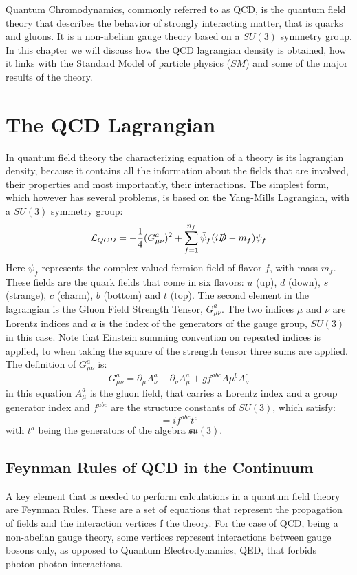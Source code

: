 Quantum Chromodynamics, commonly referred to as QCD, is the quantum field theory that describes the behavior of strongly interacting matter, that is quarks and gluons. It is a non-abelian gauge theory based on a $SU(3)$ symmetry group. In this chapter we will discuss how the QCD lagrangian density is obtained, how it links with the Standard Model of particle physics ($SM$) and some of the major results of the theory. \cite{peskin}

\section{The QCD Lagrangian}
In quantum field theory the characterizing equation of a theory is its lagrangian density, because it contains all the information about the fields that are involved, their properties and most importantly, their interactions. The simplest form, which however has several problems, is based on the Yang-Mills Lagrangian, with a $SU(3)$ symmetry group:  
\begin{equation}
  \mathcal{L}_{QCD} = -\frac{1}{4}(G_{\mu\nu}^a)^2 + \sum_{f=1}^{n_f}\bar{\psi}_f(i\slashed{D} - m_f)\psi_f
\end{equation}
Here $\psi_f$ represents the complex-valued fermion field of flavor $f$, with mass $m_f$. These fields are the quark fields that come in six flavors: $u$ (up), $d$ (down), $s$ (strange), $c$ (charm), $b$ (bottom) and $t$ (top).  The second element in the lagrangian is the Gluon Field Strength Tensor, $G_{\mu\nu}^a$. The two indices $\mu$ and $\nu$ are Lorentz indices and $a$ is the index of the generators of the gauge group, $SU(3)$ in this case. Note that Einstein summing convention on repeated indices is applied, to when taking the square of the strength tensor three sums are applied. The definition of $G_{\mu\nu}^a$ is:
\begin{equation}
  G_{\mu\nu}^a = \partial_\mu A_\nu^a - \partial_\nu A_\mu^a + gf^{abc}A\mu^b A_\nu^c 
\end{equation}
in this equation $A_\mu^a $ is the gluon field, that carries a Lorentz index and a group generator index and $f^{abc}$ are the structure constants of $SU(3)$, which satisfy:
\begin{equation}
  [t^a, t^b] = if^{abc}t^c
\end{equation} 
with $t^a$ being the generators of the algebra $\mathfrak{su}(3)$. 

\subsection{Feynman Rules of QCD in the Continuum}
A key element that is needed to perform calculations in a quantum field theory are Feynman Rules. These are a set of equations that represent the propagation of fields and the interaction vertices f the theory. For the case of QCD, being a non-abelian gauge theory, some vertices represent interactions between gauge bosons only, as opposed to Quantum Electrodynamics, QED, that forbids photon-photon interactions. 

